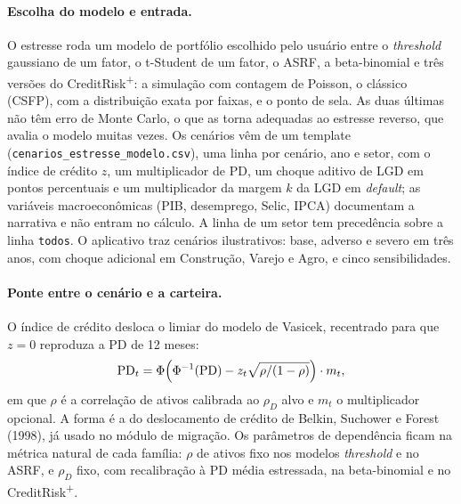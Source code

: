 \documentclass[11pt,a4paper]{article}
\begin{document}
\paragraph{Escolha do modelo e entrada.} O estresse roda um modelo de portfólio escolhido pelo usuário entre o \emph{threshold} gaussiano de um fator, o t-Student de um fator, o ASRF, a beta-binomial e três versões do CreditRisk\textsuperscript{+}: a simulação com contagem de Poisson, o clássico (CSFP), com a distribuição exata por faixas, e o ponto de sela. As duas últimas não têm erro de Monte Carlo, o que as torna adequadas ao estresse reverso, que avalia o modelo muitas vezes. Os cenários vêm de um template (\texttt{cenarios\_estresse\_modelo.csv}), uma linha por cenário, ano e setor, com o índice de crédito $z$, um multiplicador de PD, um choque aditivo de LGD em pontos percentuais e um multiplicador da margem $k$ da LGD em \emph{default}; as variáveis macroeconômicas (PIB, desemprego, Selic, IPCA) documentam a narrativa e não entram no cálculo. A linha de um setor tem precedência sobre a linha \texttt{todos}. O aplicativo traz cenários ilustrativos: base, adverso e severo em três anos, com choque adicional em Construção, Varejo e Agro, e cinco sensibilidades.

\paragraph{Ponte entre o cenário e a carteira.} O índice de crédito desloca o limiar do modelo de Vasicek, recentrado para que $z=0$ reproduza a PD de 12 meses:
\begin{equation}
\mathrm{PD}_t=\Phi\Bigl(\Phi^{-1}(\mathrm{PD})-z_t\sqrt{\rho/(1-\rho)}\Bigr)\cdot m_t,
\label{eq:pd-cenario}
\end{equation}
em que $\rho$ é a correlação de ativos calibrada ao $\rho_D$ alvo e $m_t$ o multiplicador opcional. A forma é a do deslocamento de crédito de Belkin, Suchower e Forest (1998), já usado no módulo de migração. Os parâmetros de dependência ficam na métrica natural de cada família: $\rho$ de ativos fixo nos modelos \emph{threshold} e no ASRF, e $\rho_D$ fixo, com recalibração à PD média estressada, na beta-binomial e no CreditRisk\textsuperscript{+}.
\end{document}

